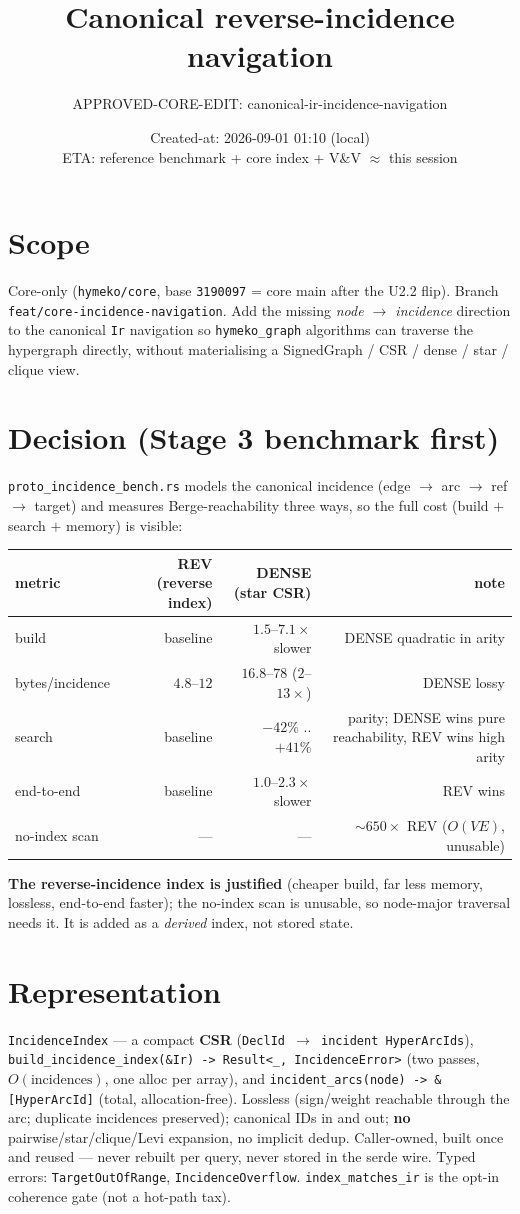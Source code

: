 \documentclass[11pt]{article}
\title{Canonical reverse-incidence navigation}
\author{APPROVED-CORE-EDIT: canonical-ir-incidence-navigation}
\date{Created-at: 2026-09-01 01:10 (local) \\ ETA: reference benchmark + core index + V\&V $\approx$ this session}
\begin{document}
\maketitle

\section*{Scope}
Core-only (\texttt{hymeko/core}, base \texttt{3190097} = core main after the U2.2
flip). Branch \texttt{feat/core-incidence-navigation}. Add the missing
\emph{node $\to$ incidence} direction to the canonical \texttt{Ir} navigation so
\texttt{hymeko\_graph} algorithms can traverse the hypergraph directly, without
materialising a SignedGraph / CSR / dense / star / clique view.

\section*{Decision (Stage 3 benchmark first)}
\texttt{proto\_incidence\_bench.rs} models the canonical incidence (edge $\to$ arc
$\to$ ref $\to$ target) and measures Berge-reachability three ways, so the full
cost (build $+$ search $+$ memory) is visible:
\begin{longtable}{lrrr}\toprule
metric & REV (reverse index) & DENSE (star CSR) & note \\\midrule
build & baseline & $1.5$--$7.1\times$ slower & DENSE quadratic in arity \\
bytes/incidence & $4.8$--$12$ & $16.8$--$78$ ($2$--$13\times$) & DENSE lossy \\
search & baseline & $-42\%$ .. $+41\%$ & parity; DENSE wins pure reachability, REV wins high arity \\
end-to-end & baseline & $1.0$--$2.3\times$ slower & REV wins \\
no-index scan & --- & --- & $\sim 650\times$ REV ($O(VE)$, unusable) \\\bottomrule
\end{longtable}
\textbf{The reverse-incidence index is justified} (cheaper build, far less
memory, lossless, end-to-end faster); the no-index scan is unusable, so
node-major traversal needs it. It is added as a \emph{derived} index, not stored
state.

\section*{Representation}
\texttt{IncidenceIndex} — a compact \textbf{CSR} (\texttt{DeclId $\to$ incident
HyperArcIds}), \texttt{build\_incidence\_index(\&Ir) -> Result<\_, IncidenceError>}
(two passes, $O(\text{incidences})$, one alloc per array), and
\texttt{incident\_arcs(node) -> \&[HyperArcId]} (total, allocation-free). Lossless
(sign/weight reachable through the arc; duplicate incidences preserved);
canonical IDs in and out; \textbf{no} pairwise/star/clique/Levi expansion, no
implicit dedup. Caller-owned, built once and reused --- never rebuilt per query,
never stored in the serde wire. Typed errors: \texttt{TargetOutOfRange},
\texttt{IncidenceOverflow}. \texttt{index\_matches\_ir} is the opt-in coherence
gate (not a hot-path tax).
\end{document}

